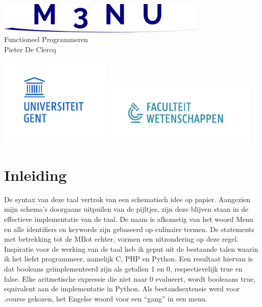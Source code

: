 \documentclass[12pt,a4paper]{report}
\begin{document}

\vspace*{\fill}
\begin{center}
\includegraphics[width=100mm]{verslag/logo.png}
\vspace*{1.5in}\\
  {\Huge Functioneel Programmeren}\\
  {\Large Pieter De Clercq}
\end{center}
\vspace*{\fill}
\begin{center}
\includegraphics[width=53mm]{verslag/logo-ugent.pdf}
\includegraphics[width=74mm]{verslag/logo-we.pdf}
\end{center}
\tableofcontents
\newpage
\chapter{Inleiding}
De syntax van deze taal vertrok van een schematisch idee op papier. Aangezien mijn schema's doorgaans uitpuilen van de pijltjes, zijn deze blijven staan in de effectieve implementatie van de taal. De naam is afkomstig van het woord Menu en alle identifiers en keywords zijn gebaseerd op culinaire termen. De statements met betrekking tot de MBot echter, vormen een uitzondering op deze regel. Inspiratie voor de werking van de taal heb ik geput uit de bestaande talen waarin ik het liefst programmeer, namelijk C, PHP en Python. Een resultaat hiervan is dat booleans geïmplementeerd zijn als getallen 1 en 0, respectievelijk true en false. Elke aritmetische expressie die niet naar 0 evalueert, wordt booleaans true, equivalent aan de implementatie in Python. Als bestandsextensie werd voor .course gekozen, het Engelse woord voor een ``gang'' in een menu.
\end{document}
